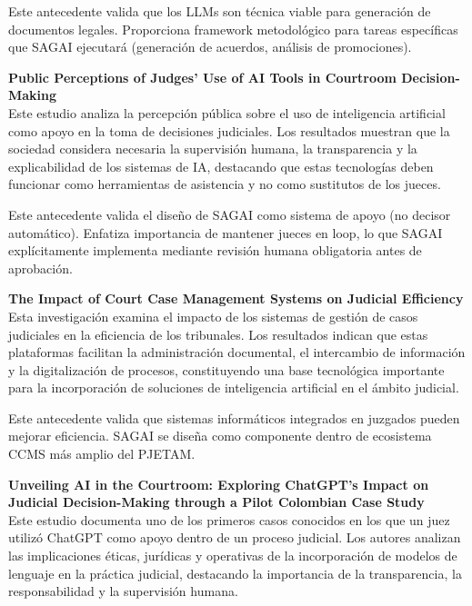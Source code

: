 Este antecedente valida que los LLMs son técnica viable para generación de documentos legales. Proporciona framework metodológico para tareas específicas que SAGAI ejecutará (generación de acuerdos, análisis de promociones).
\vspace{0.3cm}

\textbf{Public Perceptions of Judges' Use of AI Tools in Courtroom Decision-Making} \cite{PublicPerceptionsAI2025} \\
Este estudio analiza la percepción pública sobre el uso de inteligencia artificial como apoyo en la toma de decisiones judiciales. Los resultados muestran que la sociedad considera necesaria la supervisión humana, la transparencia y la explicabilidad de los sistemas de IA, destacando que estas tecnologías deben funcionar como herramientas de asistencia y no como sustitutos de los jueces.

Este antecedente valida el diseño de SAGAI como sistema de apoyo (no decisor automático). Enfatiza importancia de mantener jueces en loop, lo que SAGAI explícitamente implementa mediante revisión humana obligatoria antes de aprobación.
\vspace{0.3cm}

\textbf{The Impact of Court Case Management Systems on Judicial Efficiency} \cite{CourtCaseManagement2026} \\
Esta investigación examina el impacto de los sistemas de gestión de casos judiciales en la eficiencia de los tribunales. Los resultados indican que estas plataformas facilitan la administración documental, el intercambio de información y la digitalización de procesos, constituyendo una base tecnológica importante para la incorporación de soluciones de inteligencia artificial en el ámbito judicial.

Este antecedente valida que sistemas informáticos integrados en juzgados pueden mejorar eficiencia. SAGAI se diseña como componente dentro de ecosistema CCMS más amplio del PJETAM.
\vspace{0.3cm}

\textbf{Unveiling AI in the Courtroom: Exploring ChatGPT's Impact on Judicial Decision-Making through a Pilot Colombian Case Study} \cite{UnveilingAI2024} \\
Este estudio documenta uno de los primeros casos conocidos en los que un juez utilizó ChatGPT como apoyo dentro de un proceso judicial. Los autores analizan las implicaciones éticas, jurídicas y operativas de la incorporación de modelos de lenguaje en la práctica judicial, destacando la importancia de la transparencia, la responsabilidad y la supervisión humana.

